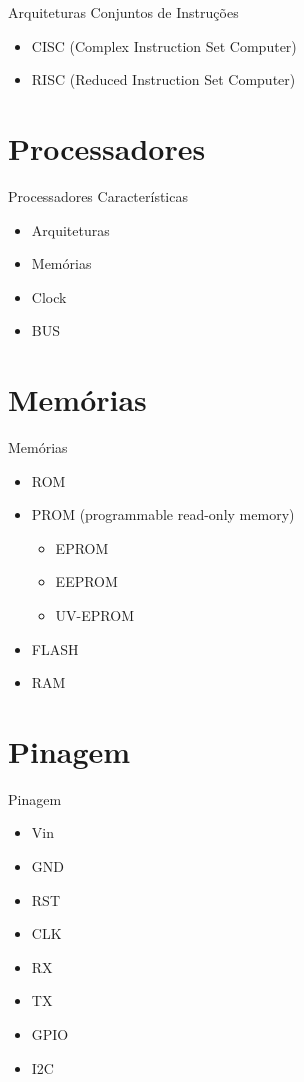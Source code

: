 \documentclass[t]{beamer}
\begin{document}
\begin{frame}{Arquiteturas}
Conjuntos de Instruções
\begin{itemize}
\item CISC (Complex Instruction Set Computer)
\item RISC (Reduced Instruction Set Computer)
\end{itemize}
\end{frame}

\section{Processadores}

\begin{frame}{Processadores}
Características
\begin{itemize}
\item Arquiteturas
\item Memórias
\item Clock
\item BUS
\end{itemize}
\end{frame}

\section{Memórias}

\begin{frame}{Memórias}
\begin{itemize}
\item ROM
\item PROM (programmable read-only memory)
\begin{itemize}
\item EPROM
\item EEPROM
\item UV-EPROM
\end{itemize}
\item FLASH
\item RAM
\end{itemize}
\end{frame}

\section{Pinagem}

\begin{frame}{Pinagem}
\begin{itemize}
\item Vin
\item GND
\item RST
\item CLK
\item RX
\item TX
\item GPIO
\item I2C
\end{itemize}
\end{frame}
\end{document}
